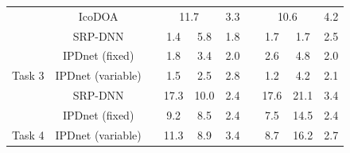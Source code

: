 \documentclass[lettersize,journal]{IEEEtran}
\begin{document}
\begin{table}[]
\begin{tabular}{cclccclccc}
                                                                          & IcoDOA                                 &  & \multicolumn{2}{c}{11.7}                                                    & 3.3                                   &  & \multicolumn{2}{c}{10.6}                                                      & 4.2                                  \\
                                                                          & SRP-DNN                                &  & 1.4                         & 5.8                                  &1.8                          &  & 1.7                                   & 1.7                          & 2.5                                  \\
                                                                          & \cellcolor[HTML]{EFEFEF}IPDnet (fixed)&  & \cellcolor[HTML]{EFEFEF}1.8          & \cellcolor[HTML]{EFEFEF}3.4 & \cellcolor[HTML]{EFEFEF}2.0           &  & \cellcolor[HTML]{EFEFEF}2.6           & \cellcolor[HTML]{EFEFEF}4.8           & \cellcolor[HTML]{EFEFEF}2.0 \\
\multirow{-5}{*}{Task 3}                                                  & \cellcolor[HTML]{EFEFEF}IPDnet (variable)&  & \cellcolor[HTML]{EFEFEF}1.5          & \cellcolor[HTML]{EFEFEF}2.5          & \cellcolor[HTML]{EFEFEF}2.8           &  & \cellcolor[HTML]{EFEFEF}1.2  & \cellcolor[HTML]{EFEFEF}4.2           & \cellcolor[HTML]{EFEFEF}2.1          \\ \midrule
                                                                          & SRP-DNN                                &  & 17.3                                 & 10.0                                 & 2.4                          &  & 17.6                                  & 21.1                                  & 3.4                                  \\
                                                                          & \cellcolor[HTML]{EFEFEF}IPDnet (fixed)&  & \cellcolor[HTML]{EFEFEF}9.2 & \cellcolor[HTML]{EFEFEF}8.5 & \cellcolor[HTML]{EFEFEF}2.4 &  & \cellcolor[HTML]{EFEFEF}7.5  & \cellcolor[HTML]{EFEFEF}14.5 & \cellcolor[HTML]{EFEFEF}2.4 \\
\multirow{-3}{*}{Task 4}                                                  & \cellcolor[HTML]{EFEFEF}IPDnet (variable)&  & \cellcolor[HTML]{EFEFEF}11.3         & \cellcolor[HTML]{EFEFEF}8.9          & \cellcolor[HTML]{EFEFEF}3.4           &  & \cellcolor[HTML]{EFEFEF}8.7           & \cellcolor[HTML]{EFEFEF}16.2          & \cellcolor[HTML]{EFEFEF}2.7          \\ \midrule

\end{tabular}
\end{table}
\end{document}
